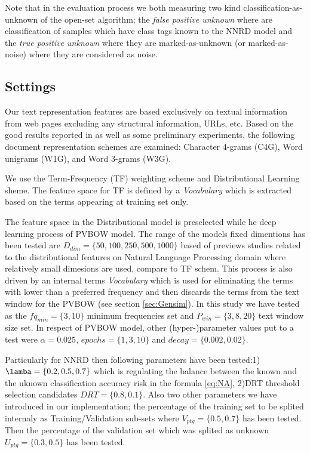 \documentclass[runningheads]{llncs}
\begin{document}
Note that in the evaluation process we both measuring two kind classification-as-unknown of the open-set algorithm; the \textit{false positive unknown} where are classification of samples which have class tags known to the NNRD model and the \textit{true positive unknown} where they are marked-as-unknown (or marked-as-noise) where they are considered as noise.

\subsection{Settings}\label{sec:evaluation_measures}

Our text representation features are based exclusively on textual information from web pages excluding any structural information, URLs, etc. Based on the good results reported in \citep{sharoff2010web,pritsos2013open,Asheghi2015} as well as some preliminary experiments, the following document representation schemes are examined: Character 4-grams (C4G), Word unigrams (W1G), and Word 3-grams (W3G).

We use the Term-Frequency (TF) weighting scheme and Distributional Learning sheme. The feature space for TF is defined by a \textit{Vocabulary} which is extracted based on the terms appearing at training set only.

The feature space in the Distributional model is preselected while he deep learning process of PVBOW model. The range of the models fixed dimentions has been tested are $D_{dim}=\{50,100,250,500,1000\}$ based of previews studies related to the distributional features on Natural Language Processing domain where relatively small dimesions are used, compare to TF schem. This process is also driven by an internal terms \textit{Vocabulary} which is used for eliminating the terms with lower than a preferred frequency and then discards the terms from the text window for the PVBOW (see section \ref{sec:Gensim}). In this study we have tested as the $fq_{min}=\{3,10\}$ minimum frequencies set and $P_{win}=\{3,8,20\}$ text window size set. In respect of PVBOW model, other (hyper-)parameter values put to a test were $\alpha=0.025$, $epochs=\{1, 3, 10\}$ and $decay=\{0.002,0.02\}$.

Particularly for NNRD then following parameters have been tested:1) $\lamba=\{0.2,0.5,0.7\}$ which is regulating the balance between the known and the uknown classification accuracy risk in the formula \ref{eq:NA}, 2)DRT threshold selection candidates $DRT=\{0.8,0.1\}$. Also two other parameters we have introduced in our implementation; the percentage of the training set to be splited internaly as Training/Validation sub-sets where $V_{ptg}=\{0.5,0.7\}$ has been tested. Then the percentage of the validation set which was splited as unknown $U_{ptg}=\{0.3,0.5\}$ has been tested.
\end{document}
